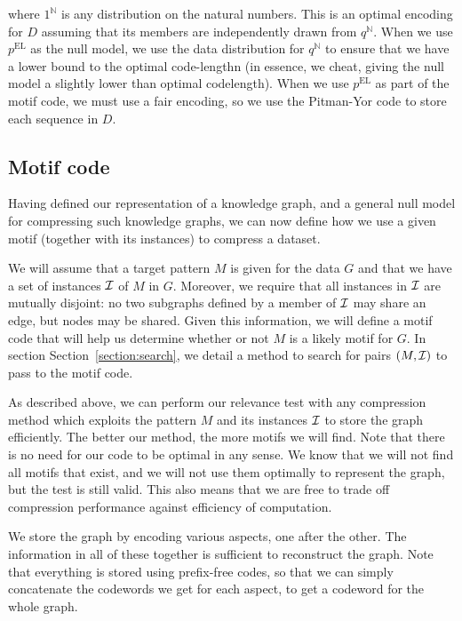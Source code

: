 \documentclass[runningheads]{style/llncs}
\newcommand{\N}{{\mathbb N}}
\newcommand{\I}{{\cal I}}
\begin{document}
where $1^{\N}$ is any distribution on the natural numbers. This is an optimal encoding for $D$ assuming that its members are independently drawn from $q^{\N}$. When we use $p^\text{EL}$ as the null model, we use the data distribution for $q^{\N}$ to ensure that we have a lower bound to the optimal code-lengthn (in essence, we cheat, giving the null model a slightly lower than optimal codelength). When we use $p^\text{EL}$ as part of the motif code, we must use a fair encoding, so we use the Pitman-Yor code to store each sequence in $D$.
%

\subsection{Motif code}

Having defined our representation of a knowledge graph, and a general null model for compressing such knowledge graphs, we can now define how we use a given motif (together with its instances) to compress a dataset. 

We will assume that a target pattern $M$ is given for the data $G$ and that we have a set of instances $\I$ of $M$ in $G$. Moreover, we require that all instances in $\I$ are mutually disjoint: no two subgraphs defined by a member of $\I$ may share an edge, but nodes may be shared. Given this information, we will define a motif code that will help us determine whether or not $M$ is a likely motif for $G$. In section Section~\ref{section:search}, we detail a method to search for pairs $(M, \I)$ to pass to the motif code.

As described above, we can perform our relevance test with any compression method which exploits the pattern $M$ and its instances $\I$ to store the graph efficiently. The better our method, the more motifs we will find. Note that there is no need for our code to be optimal in any sense. We know that we will not find all motifs that exist, and we will not use them optimally to represent the graph, but the test is still valid. This also means that we are free to trade off compression performance against efficiency of computation.

We store the graph by encoding various aspects, one after the other. The information in all of these together is sufficient to reconstruct the graph. Note that everything is stored using prefix-free codes, so that we can simply concatenate the codewords we get for each aspect, to get a codeword for the whole graph.
\end{document}
